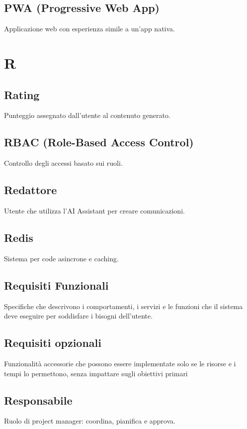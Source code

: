\documentclass[a4paper,12pt]{article}
\begin{document}
\subsection{PWA (Progressive Web App)}
Applicazione web con esperienza simile a un'app nativa.

\section{R}
\subsection{Rating}
Punteggio assegnato dall'utente al contenuto generato.

\subsection{RBAC (Role-Based Access Control)}
Controllo degli accessi basato sui ruoli.

\subsection{Redattore}
Utente che utilizza l'AI Assistant per creare comunicazioni.

\subsection{Redis}
Sistema per code asincrone e caching.

\subsection{Requisiti Funzionali}
Specifiche che descrivono i comportamenti, i servizi e le funzioni che il sistema deve eseguire per soddisfare i bisogni dell'utente.

\subsection{Requisiti opzionali}
Funzionalità accessorie che possono essere implementate solo se le risorse e i tempi lo permettono, senza impattare sugli obiettivi primari

\subsection{Responsabile}
Ruolo di project manager: coordina, pianifica e approva.
\end{document}
